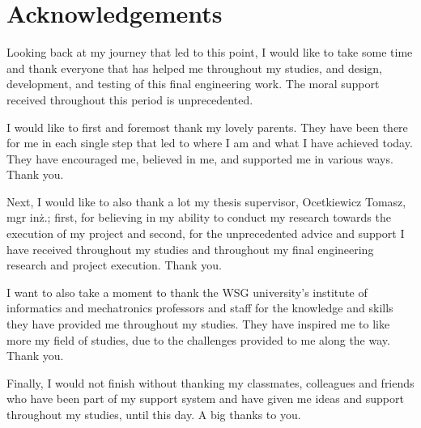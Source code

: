 
\cleardoublepage


\section*{\centering \Large Acknowledgements}

\begin{acknowledgements}

    Looking back at my journey that led to this point, I would like to take some time and thank everyone that has helped me throughout my studies, and design, development, and testing of this final engineering work. The moral support received throughout this period is unprecedented.

    I would like to first and foremost thank my lovely parents. They have been there for me in each single step that led to where I am and what I have achieved today. They have encouraged me, believed in me, and supported me in various ways. Thank you.

    Next, I would like to also thank a lot my thesis supervisor, Ocetkiewicz Tomasz, mgr inż.; first, for believing in my ability to conduct my research towards the execution of my project and second, for the unprecedented advice and support I have received throughout my studies and throughout my final engineering research and project execution. Thank you.

    I want to also take a moment to thank the WSG university’s institute of informatics and mechatronics professors and staff for the knowledge and skills they have provided me throughout my studies. They have inspired me to like more my field of studies, due to the challenges provided to me along the way. Thank you.

    Finally, I would not finish without thanking my classmates, colleagues and friends who have been part of my support system and have given me ideas and support throughout my studies, until this day. A big thanks to you.


\end{acknowledgements}

